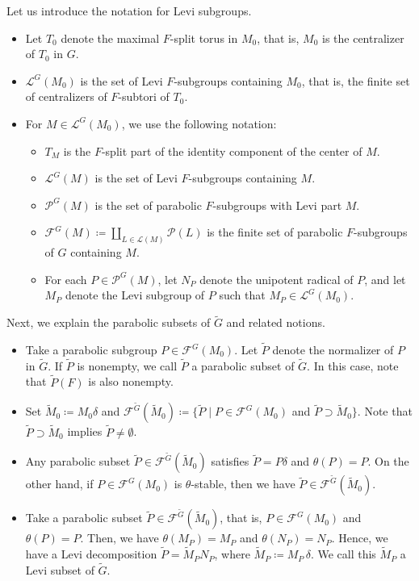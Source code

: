 \documentclass[12pt]{amsart}
\theoremstyle{definition}
\theoremstyle{plain}
\theoremstyle{remark}
\newcommand{\cF}{\mathcal{F}}
\newcommand{\cL}{\mathcal{L}}
\newcommand{\cP}{\mathcal{P}}
\numberwithin{equation}{section}
\newcommand{\tG}{\widetilde{G}}
\newcommand{\tM}{\widetilde{M}}
\newcommand{\tP}{\widetilde{P}}
\begin{document}
Let us introduce the notation for Levi subgroups.
\begin{itemize}
    \item Let $T_0$ denote the maximal $F$-split torus in $M_0$, that is, $M_0$ is the centralizer of $T_0$ in $G$. 
    \item $\cL^G(M_0)$ is the set of Levi $F$-subgroups containing $M_0$, that is, the finite set of centralizers of $F$-subtori of $T_0$. 
\item For $M\in\cL^G(M_0)$, we use the following notation:
\begin{itemize}        
    \item $T_M$ is the $F$-split part of the identity component of the center of $M$. 
    \item $\cL^G(M)$ is the set of Levi $F$-subgroups containing $M$. 
    \item $\cP^G(M)$ is the set of parabolic $F$-subgroups with Levi part $M$. 
    \item $\cF^G(M)\coloneqq\coprod_{L\in\cL(M)} \cP(L)$ is the finite set of parabolic $F$-subgroups of $G$ containing $M$. 
    \item For each $P\in\cP^G(M)$, let $N_P$ denote the unipotent radical of $P$, and let $M_P$ denote the Levi subgroup of $P$ such that $M_P\in \cL^G(M_0)$. 
\end{itemize}
\end{itemize}
Next, we explain the parabolic subsets of $\tG$ and related notions.
\begin{itemize}
    \item Take a parabolic subgroup $P\in\cF^G(M_0)$. Let $\tP$ denote the normalizer of $P$ in $\tG$. If $\tP$ is nonempty, we call $\tP$ a parabolic subset of $\tG$. In this case, note that $\tP(F)$ is also nonempty.
    \item Set $\tM_0\coloneqq M_0\delta$ and $\cF^{\tG}(\tM_0)\coloneqq\{ \tP \mid P\in\cF^G(M_0)$ and $\tP\supset\tM_0 \}$. Note that $\tP\supset\tM_0$ implies $\tP\neq \emptyset$. 
    \item Any parabolic subset $\tP\in\cF^{\tG}(\tM_0)$ satisfies $\tP=P\delta$ and $\theta(P)=P$. 
    On the other hand, if $P \in \cF^G(M_0)$ is $\theta$-stable, then we have $\tP \in \cF^{\tG}(\tM_0)$.
    \item Take a parabolic subset $\tP\in \cF^{\tG}(\tM_0)$, that is, $P\in\cF^G(M_0)$ and $\theta(P)=P$. 
    Then, we have $\theta(M_P)=M_P$ and $\theta(N_P)=N_P$. Hence, we have a Levi decomposition $\tP = \tM_P N_P$, where $\tM_P\coloneqq M_P\, \delta$. 
    We call this $\tM_P$ a Levi subset of $\tG$.
\end{itemize}
\end{document}
